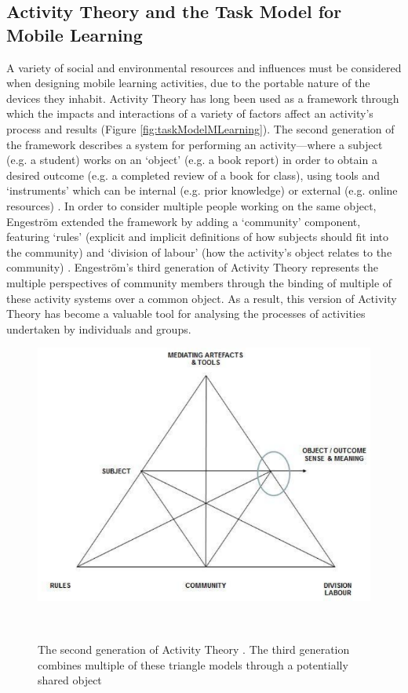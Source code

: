 \subsection{Activity Theory and the Task Model for Mobile Learning}
A variety of social and environmental resources and influences must be considered when designing mobile learning activities, due to the portable nature of the devices they inhabit. Activity Theory has long been used as a framework through which the impacts and interactions of a variety of factors affect an activity’s process and results (Figure \ref{fig:taskModelMLearning}). The second generation of the framework describes a system for performing an activity---where a subject (e.g. a student) works on an `object' (e.g. a book report) in order to obtain a desired outcome (e.g. a completed review of a book for class), using tools and `instruments' which can be internal (e.g. prior knowledge) or external (e.g. online resources) \citep{leont1978}. In order to consider multiple people working on the same object, Engestr{\"o}m extended the framework by adding a `community' component, featuring `rules' (explicit and implicit definitions of how subjects should fit into the community) and `division of labour' (how the activity's object relates to the community) \citep{Engestrom2001}. Engestr{\"o}m's third generation of Activity Theory represents the multiple perspectives of community members through the binding of multiple of these activity systems over a common object. As a result, this version of Activity Theory has become a valuable tool for analysing the processes of activities undertaken by individuals and groups.

\begin{figure}
\centering
  \includegraphics[width=0.8\columnwidth]{images/chapter03/activityTheory.PNG}
  \caption{The second generation of Activity Theory \citep{leont1978, Engestrom1987}. The third generation combines multiple of these triangle models through a potentially shared object \citep{Engestrom2001} }~\label{fig:activityTheory}
\end{figure}



